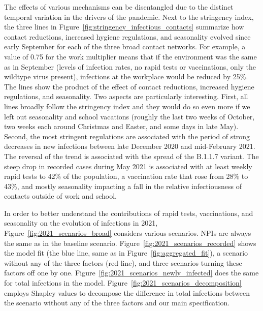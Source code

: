 The effects of various mechanisms can be disentangled due to the distinct temporal
variation in the drivers of the pandemic. Next to the stringency index, the three lines
in Figure~\ref{fig:stringency_infectious_contacts} summarize how contact reductions,
increased hygiene regulations, and seasonality evolved since early September for each of
the three broad contact networks. For example, a value of 0.75 for the work multiplier
means that if the environment was the same as in September (levels of infection rates,
no rapid tests or vaccinations, only the wildtype virus present), infections at the
workplace would be reduced by 25\%. The lines show the product of the effect of contact
reductions, increased hygiene regulations, and seasonality. Two aspects are particularly
interesting. First, all lines broadly follow the stringency index and they would do so
even more if we left out seasonality and school vacations (roughly the last two weeks of
October, two weeks each around Christmas and Easter, and some days in late May). Second,
the most stringent regulations are associated with the period of strong decreases in new
infections between late December 2020 and mid-February 2021. The reversal of the trend
is associated with the spread of the B.1.1.7 variant. The steep drop in recorded cases
during May 2021 is associated with at least weekly rapid tests to 42\% of the
population, a vaccination rate that rose from 28\% to 43\%, and mostly seasonality
impacting a fall in the relative infectiousness of contacts outside of work and school.

In order to better understand the contributions  of rapid tests, vaccinations, and
seasonality on the evolution of infections in 2021,
Figure~\ref{fig:2021_scenarios_broad} considers various scenarios. NPIs are always the
same as in the baseline scenario. Figure~\ref{fig:2021_scenarios_recorded} shows the
model fit (the blue line, same as in Figure~\ref{fig:aggregated_fit}), a scenario
without any of the three factors (red line), and three scenarios turning these factors
off one by one. Figure~\ref{fig:2021_scenarios_newly_infected} does the same for total
infections in the model. Figure~\ref{fig:2021_scenarios_decomposition} employs Shapley
values \citep{Shapley2016} to decompose the difference in total infections between the
scenario without any of the three factors and our main specification.

